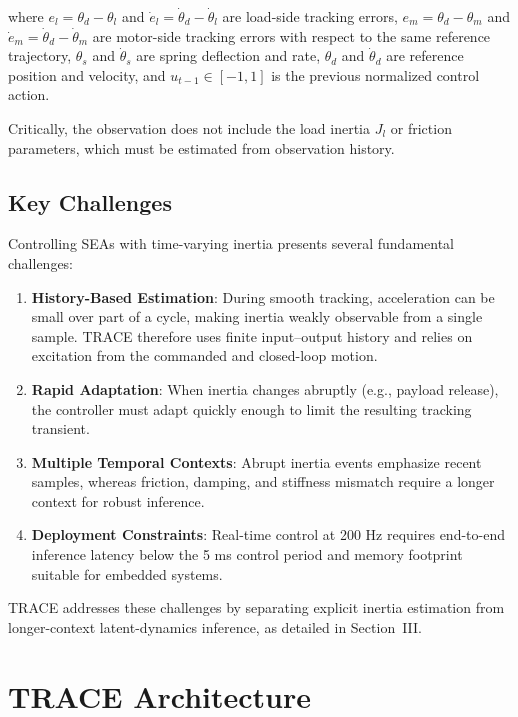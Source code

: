 \documentclass[letterpaper,journal]{IEEEtran}
\begin{document}
\noindent where $e_{l} = \theta_d - \theta_l$ and $\dot{e}_{l} = \dot{\theta}_d - \dot{\theta}_l$ are load-side tracking errors, $e_{m} = \theta_d - \theta_m$ and $\dot{e}_{m} = \dot{\theta}_d - \dot{\theta}_m$ are motor-side tracking errors with respect to the same reference trajectory, $\theta_s$ and $\dot{\theta}_s$ are spring deflection and rate, $\theta_d$ and $\dot{\theta}_d$ are reference position and velocity, and $u_{t-1} \in [-1, 1]$ is the previous normalized control action.

Critically, the observation does not include the load inertia $J_l$ or friction parameters, which must be estimated from observation history.

\subsection{Key Challenges}

Controlling SEAs with time-varying inertia presents several fundamental challenges:

\begin{enumerate}
\item \textbf{History-Based Estimation}: During smooth tracking, acceleration can be small over part of a cycle, making inertia weakly observable from a single sample. TRACE therefore uses finite input--output history and relies on excitation from the commanded and closed-loop motion.

\item \textbf{Rapid Adaptation}: When inertia changes abruptly (e.g., payload release), the controller must adapt quickly enough to limit the resulting tracking transient.

\item \textbf{Multiple Temporal Contexts}: Abrupt inertia events emphasize recent samples, whereas friction, damping, and stiffness mismatch require a longer context for robust inference.

\item \textbf{Deployment Constraints}: Real-time control at 200 Hz requires end-to-end inference latency below the 5 ms control period and memory footprint suitable for embedded systems.
\end{enumerate}

TRACE addresses these challenges by separating explicit inertia estimation from longer-context latent-dynamics inference, as detailed in Section~III.

\section{TRACE Architecture}
\end{document}
